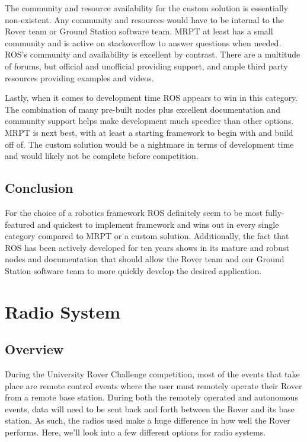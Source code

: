 \documentclass[onecolumn, draftclsnofoot, 10pt, compsoc]{IEEEtran}
\begin{document}
The community and resource availability for the custom solution is essentially non-existent. Any community and resources would have to be internal to the Rover team or Ground Station software team. MRPT at least has a small community and is active on stackoverflow to answer questions when needed. ROS's community and availability is excellent by contrast. There are a multitude of forums, but official and unofficial providing support, and ample third party resources providing examples and videos.

Lastly, when it comes to development time ROS appears to win in this category. The combination of many pre-built nodes plus excellent documentation and community support helps make development much speedier than other options. MRPT is next best, with at least a starting framework to begin with and build off of. The custom solution would be a nightmare in terms of development time and would likely not be complete before competition.

\subsection{Conclusion}
For the choice of a robotics framework ROS definitely seem to be most fully-featured and quickest to implement framework and wins out in every single category compared to MRPT or a custom solution.
Additionally, the fact that ROS has been actively developed for ten years shows in its mature and robust nodes and documentation that should allow the Rover team and our Ground Station software team to more quickly develop the desired application.

\section{Radio System}
\subsection{Overview}
During the University Rover Challenge competition, most of the events that take place are remote control events where the user must remotely operate their Rover from a remote base station. During both the remotely operated and autonomous events, data will need to be sent back and forth between the Rover and its base station. As such, the radios used make a huge difference in how well the Rover performs. Here, we'll look into a few different options for radio systems.
\end{document}
